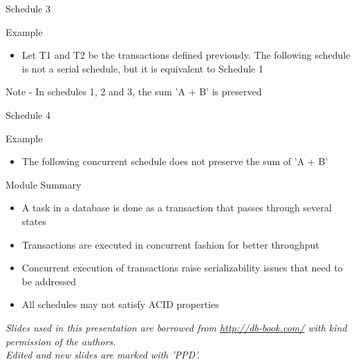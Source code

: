 \documentclass[aspectratio=169, xcolor=dvipsnames]{beamer}
\begin{document}
\begin{frame}{Schedule 3}
    \begin{exampleblock}{Example}
        \begin{itemize}[<+->]
            \item Let T1 and T2 be the transactions defined previously. The following schedule is not a serial schedule, but it is equivalent to Schedule 1
        \end{itemize}
    \end{exampleblock}
    Note - In schedules 1, 2 and 3, the sum 'A + B' is preserved
\end{frame}

\begin{frame}{Schedule 4}
    \begin{exampleblock}{Example}
        \begin{itemize}[<+->]
            \item The following concurrent schedule does not preserve the sum of 'A + B'
        \end{itemize}
    \end{exampleblock}
\end{frame}

\begin{frame}{Module Summary}
    \begin{block}{}
        \begin{itemize}[<+->]
            \item A task in a database is done as a transaction that passes through several states
            \item Transactions are executed in concurrent fashion for better throughput
            \item Concurrent execution of transactions raise serializability issues that need to be addressed
            \item All schedules may not satisfy ACID properties
        \end{itemize}
    \end{block}
    \vspace{2em}
    \begin{center}
    \small \textit{Slides used in this presentation are borrowed from \url{http://db-book.com/} with kind permission of the authors.} \\
    \small \textit{Edited and new slides are marked with 'PPD'.}
    \end{center}
\end{frame}
\end{document}
